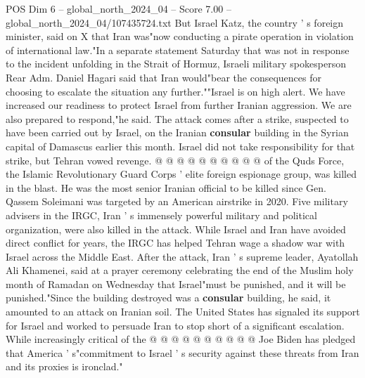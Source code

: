 \begin{textsample}{POS Dim 6 – global\_north\_2024\_04 – Score 7.00 – global\_north\_2024\_04/107435724.txt}
But Israel Katz, the country ' s foreign minister, said on X that Iran was"now conducting a pirate operation in violation of international law."In a separate statement Saturday that was not in response to the incident unfolding in the Strait of Hormuz, Israeli military spokesperson Rear Adm.
Daniel Hagari said that Iran would"bear the consequences for choosing to escalate the situation any further.""Israel is on high alert.
We have increased our readiness to protect Israel from further Iranian aggression.
We are also prepared to respond,"he said.
The attack comes after a strike, suspected to have been carried out by Israel, on the Iranian \textbf{consular} building in the Syrian capital of Damascus earlier this month.
Israel did not take responsibility for that strike, but Tehran vowed revenge. @ @ @ @ @ @ @ @ @ @ of the Quds Force, the Islamic Revolutionary Guard Corps ' elite foreign espionage group, was killed in the blast.
He was the most senior Iranian official to be killed since Gen.
Qassem Soleimani was targeted by an American airstrike in 2020.
Five military advisers in the IRGC, Iran ' s immensely powerful military and political organization, were also killed in the attack.
While Israel and Iran have avoided direct conflict for years, the IRGC has helped Tehran wage a shadow war with Israel across the Middle East.
After the attack, Iran ' s supreme leader, Ayatollah Ali Khamenei, said at a prayer ceremony celebrating the end of the Muslim holy month of Ramadan on Wednesday that Israel"must be punished, and it will be punished."Since the building destroyed was a \textbf{consular} building, he said, it amounted to an attack on Iranian soil.
The United States has signaled its support for Israel and worked to persuade Iran to stop short of a significant escalation.
While increasingly critical of the @ @ @ @ @ @ @ @ @ @ Joe Biden has pledged that America ' s"commitment to Israel ' s security against these threats from Iran and its proxies is ironclad."

\end{textsample}
